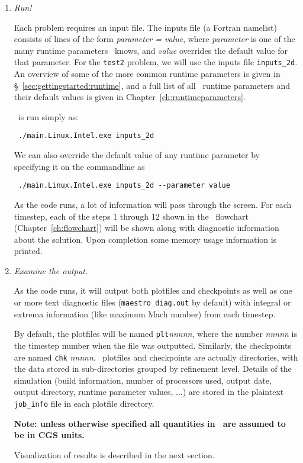 \begin{enumerate}
\item {\em Run!}

Each problem requires an input file.  The inputs file (a Fortran
namelist) consists of
lines of the form {\em parameter = value}, where {\em parameter} is
one of the many runtime parameters \maestro\ knows, and {\em value}
overrides the default value for that parameter.  For the {\tt test2}
problem, we will use the inputs file {\tt inputs\_2d}.  An overview of
some of the more common runtime parameters is given
in \S~\ref{sec:gettingstarted:runtime}, and a full list of
all \maestro\ runtime parameters and their default values is given in
Chapter~\ref{ch:runtimeparameters}.

\maestro\ is run simply as:
\begin{verbatim}
 ./main.Linux.Intel.exe inputs_2d
\end{verbatim}
We can also override the default value of any runtime parameter by specifying
it on the commandline as
\begin{verbatim}
 ./main.Linux.Intel.exe inputs_2d --parameter value
\end{verbatim}

As the code runs, a lot of information will pass through the screen.
For each timestep, each of the steps 1 through 12 shown in
the \maestro\ flowchart (Chapter~\ref{ch:flowchart}) will be shown
along with diagnostic information about the solution.  Upon completion
some memory usage information is printed.


\item {\em Examine the output}.

As the code runs, it will output both plotfiles and checkpoints as
well as one or more text diagnostic files ({\tt maestro\_diag.out} by
default) with integral or extrema information (like maximum Mach
number) from each timestep.

By default, the plotfiles will be named {\tt plt}{\em nnnnn}, where
the number {\em nnnnn} is the timestep number when the file was
outputted.  Similarly, the checkpoints are named {\tt chk}{\em
nnnnn}.  \boxlib\ plotfiles and checkpoints are actually directories,
with the data stored in sub-directories grouped by refinement level.
Details of the simulation (build information, number of processors
used, output date, output directory, runtime parameter values, ...)
are stored in the plaintext {\tt job\_info} file in each plotfile directory.

{\bf Note: unless otherwise specified all quantities in \maestro\ are
assumed to be in CGS units.}

Visualization of results is described in the next section.


\end{enumerate}


